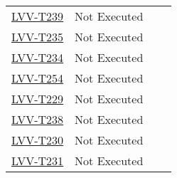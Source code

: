 \documentclass[SE,lsstdraft,STR,toc]{lsstdoc}
\begin{document}
\begin{longtable}{p{2cm}p{2.5cm}p{9cm}p{2.5cm}}
\begin{minipage}[]{9cm}
    \medskip
    \end{minipage}
    &
    \\\hline
    \href{https://jira.lsstcorp.org/secure/Tests.jspa#/testCase/LVV-T239}{LVV-T239}
    & Not Executed &
    \begin{minipage}[]{9cm}
    \smallskip
    
    \medskip
    \end{minipage}
    &
    \\\hline
    \href{https://jira.lsstcorp.org/secure/Tests.jspa#/testCase/LVV-T235}{LVV-T235}
    & Not Executed &
    \begin{minipage}[]{9cm}
    \smallskip
    
    \medskip
    \end{minipage}
    &
    \\\hline
    \href{https://jira.lsstcorp.org/secure/Tests.jspa#/testCase/LVV-T234}{LVV-T234}
    & Not Executed &
    \begin{minipage}[]{9cm}
    \smallskip
    
    \medskip
    \end{minipage}
    &
    \\\hline
    \href{https://jira.lsstcorp.org/secure/Tests.jspa#/testCase/LVV-T254}{LVV-T254}
    & Not Executed &
    \begin{minipage}[]{9cm}
    \smallskip
    
    \medskip
    \end{minipage}
    &
    \\\hline
    \href{https://jira.lsstcorp.org/secure/Tests.jspa#/testCase/LVV-T229}{LVV-T229}
    & Not Executed &
    \begin{minipage}[]{9cm}
    \smallskip
    
    \medskip
    \end{minipage}
    &
    \\\hline
    \href{https://jira.lsstcorp.org/secure/Tests.jspa#/testCase/LVV-T238}{LVV-T238}
    & Not Executed &
    \begin{minipage}[]{9cm}
    \smallskip
    
    \medskip
    \end{minipage}
    &
    \\\hline
    \href{https://jira.lsstcorp.org/secure/Tests.jspa#/testCase/LVV-T230}{LVV-T230}
    & Not Executed &
    \begin{minipage}[]{9cm}
    \smallskip
    
    \medskip
    \end{minipage}
    &
    \\\hline
    \href{https://jira.lsstcorp.org/secure/Tests.jspa#/testCase/LVV-T231}{LVV-T231}
    & Not Executed &
    \begin{minipage}[]{9cm}
    \smallskip
    

\end{minipage}
\end{longtable}
\end{document}
